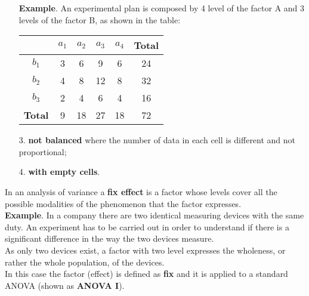 \begin{frame}
  \begin{itemize}
  \item[]  \textbf{Example}. An experimental plan is composed by 4 level of the factor A and 3 levels of the factor B, as shown in the table:
    \begin{center}
      \begin{tabular}{|c|c|c|c|c|c|}
        \hline
        & $a_1$ &   $a_2$ &  $a_3$ &  $a_4$ & \textbf{Total}\\ \hline
        $b_1$ & 3 & 6 & 9 & 6 & 24\\ \hline
        $b_2$ & 4 & 8 & 12 & 8 & 32\\ \hline
        $b_3$ & 2 & 4 & 6 & 4 & 16\\ \hline
        \textbf{Total} & 9 & 18 & 27 & 18 & 72\\ \hline
      \end{tabular}
    \end{center}
    \vspace{.5cm}
    \item[3.] \textbf{not balanced} where the number of data in each cell is different and not proportional;
    \vspace{.15cm}
    \item[4.] \textbf{with empty cells}.
  \end{itemize}
\end{frame}


\begin{frame}
\vspace*{.25cm} 
In an analysis of variance a \textbf{fix effect} is a factor whose levels cover all the possible modalities of the phenomenon that the factor expresses.\\
\vspace*{.5cm} 
\textbf{Example}. In a company there are two identical measuring devices with the same duty. An experiment has to be carried out in order to understand if there is a significant difference in the way the two devices measure.\\
\vspace*{.5cm} 
As only two devices exist, a factor with two level expresses the wholeness, or rather the whole population, of the devices.\\
\vspace*{.5cm} 
In this case the factor (effect) is defined as \textbf{fix} and it is applied to a standard ANOVA (shown as \textbf{ANOVA I}).
\end{frame}

